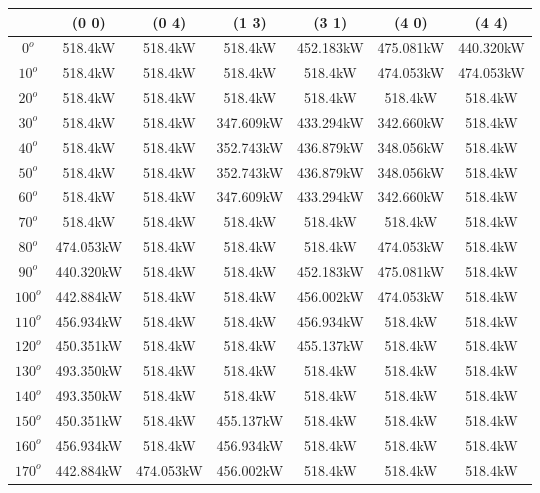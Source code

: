         \singlespacing
        \begin{table}[H]
        	\centering
        	\begin{tabular}{|c|c|c|c|c|c|c|} \hline
        			& (0 0)		& (0 4)		& (1 3)		& (3 1)		& (4 0)		& (4 4)		\\ \hline
        		$0^o$	& 518.4kW	& 518.4kW	& 518.4kW	& 452.183kW	& 475.081kW	& 440.320kW	\\ \hline
        		$10^o$	& 518.4kW	& 518.4kW	& 518.4kW	& 518.4kW	& 474.053kW	& 474.053kW	\\ \hline
        		$20^o$	& 518.4kW	& 518.4kW	& 518.4kW	& 518.4kW	& 518.4kW	& 518.4kW	\\ \hline
        		$30^o$	& 518.4kW	& 518.4kW	& 347.609kW	& 433.294kW	& 342.660kW	& 518.4kW	\\ \hline
        		$40^o$	& 518.4kW	& 518.4kW	& 352.743kW	& 436.879kW	& 348.056kW	& 518.4kW	\\ \hline
        		$50^o$	& 518.4kW	& 518.4kW	& 352.743kW	& 436.879kW	& 348.056kW	& 518.4kW	\\ \hline
        		$60^o$	& 518.4kW	& 518.4kW	& 347.609kW	& 433.294kW	& 342.660kW	& 518.4kW	\\ \hline
        		$70^o$	& 518.4kW	& 518.4kW	& 518.4kW	& 518.4kW	& 518.4kW	& 518.4kW	\\ \hline
        		$80^o$	& 474.053kW	& 518.4kW	& 518.4kW	& 518.4kW	& 474.053kW	& 518.4kW	\\ \hline
        		$90^o$	& 440.320kW	& 518.4kW	& 518.4kW	& 452.183kW	& 475.081kW	& 518.4kW	\\ \hline
        		$100^o$	& 442.884kW	& 518.4kW	& 518.4kW	& 456.002kW	& 474.053kW	& 518.4kW	\\ \hline
        		$110^o$	& 456.934kW	& 518.4kW	& 518.4kW	& 456.934kW	& 518.4kW	& 518.4kW	\\ \hline
        		$120^o$	& 450.351kW	& 518.4kW	& 518.4kW	& 455.137kW	& 518.4kW	& 518.4kW	\\ \hline
        		$130^o$	& 493.350kW	& 518.4kW	& 518.4kW	& 518.4kW	& 518.4kW	& 518.4kW	\\ \hline
        		$140^o$	& 493.350kW	& 518.4kW	& 518.4kW	& 518.4kW	& 518.4kW	& 518.4kW	\\ \hline
        		$150^o$	& 450.351kW	& 518.4kW	& 455.137kW	& 518.4kW	& 518.4kW	& 518.4kW	\\ \hline
        		$160^o$	& 456.934kW	& 518.4kW	& 456.934kW	& 518.4kW	& 518.4kW	& 518.4kW	\\ \hline
        		$170^o$	& 442.884kW	& 474.053kW	& 456.002kW	& 518.4kW	& 518.4kW	& 518.4kW	\\ \hline

\end{tabular}
\end{table}
